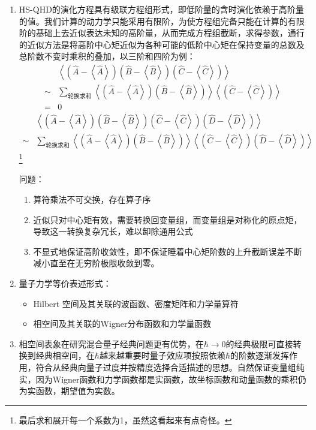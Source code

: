 \documentclass[12pt,a4paper,openany,twoside]{book}
\numberwithin{equation}{section}
\newcommand{\mean}[1]{\left\langle #1 \right\rangle}
\begin{document}
\begin{enumerate}
        \item HS-QHD的演化方程具有级联方程组形式，即低阶量的含时演化依赖于高阶量的值。我们计算的动力学只能采用有限阶，为使方程组完备只能在计算的有限阶的基础上去近似表达未知的高阶量，从而完成方程组截断，求得参数，通行的近似方法是将高阶中心矩近似为各种可能的低阶中心矩在保持变量的总数及总阶数不变时乘积的叠加，以三阶和四阶为例：
          \begin{align*}
            &\mean{(\hat{A}-\mean{\hat{A}})(\hat{B}-\mean{\hat{B}})(\hat{C}-\mean{\hat{C}})}\\
            \sim & \sum_{\text{轮换求和}}\mean{(\hat{A}-\mean{\hat{A}})(\hat{B}-\mean{\hat{B}})}\mean{(\hat{C}-\mean{\hat{C}})}\\
            =& 0
          \end{align*}
          \begin{align*}
            &\mean{(\hat{A}-\mean{\hat{A}})(\hat{B}-\mean{\hat{B}})(\hat{C}-\mean{\hat{C}})(\hat{D}-\mean{\hat{D}})}\\
            \sim & \sum_{\text{轮换求和}}\mean{(\hat{A}-\mean{\hat{A}})(\hat{B}-\mean{\hat{B}})}\mean{(\hat{C}-\mean{\hat{C}})(\hat{D}-\mean{\hat{D}})}
          \end{align*}\footnote{最后求和展开每一个系数为1，虽然这看起来有点奇怪。}

          问题：
          \begin{enumerate}

            \item 算符乘法不可交换，存在算子序
            \item 近似只对中心矩有效，需要转换回变量组，而变量组是对称化的原点矩，导致这一转换复杂冗长，难以卸除通用公式

            \item 不显式地保证高阶收敛性，即不保证睡着中心矩阶数的上升截断误差不断减小直至在无穷阶极限收敛到零。

          \end{enumerate}


        \item 量子力学等价表述形式：
          \begin{itemize}
            \item Hilbert 空间及其关联的波函数、密度矩阵和力学量算符
            \item 相空间及其关联的Wigner分布函数和力学量函数
          \end{itemize}

        \item 相空间表象在研究混合量子经典问题更有优势，在$\hbar \rightarrow 0$的经典极限可直接转换到经典相空间，在$\hbar$越来越重要时量子效应项按照依赖$\hbar$的阶数逐渐发挥作用，符合从经典向量子过度并按精度选择合适描述的思想。自然保证变量组纯实，因为Wigner函数和力学函数都是实函数，故坐标函数和动量函数的乘积仍为实函数，期望值为实数。


\end{enumerate}
\end{document}
